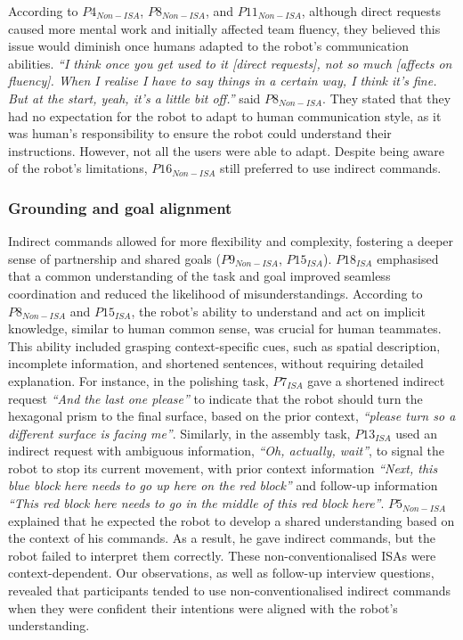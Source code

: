 According to $P4_{Non-ISA}$, $P8_{Non-ISA}$, and $P11_{Non-ISA}$, although direct requests caused more mental work and initially affected team fluency, they believed this issue would diminish once humans adapted to the robot's communication abilities. \textit{``I think once you get used to it [direct requests], not so much [affects on fluency]. When I realise I have to say things in a certain way, I think it's fine. But at the start, yeah, it's a little bit off.''} said $P8_{Non-ISA}$.
They stated that they had no expectation for the robot to adapt to human communication style, as it was human's responsibility to ensure the robot could understand their instructions. However, not all the users were able to adapt. Despite being aware of the robot’s limitations, $P16_{Non-ISA}$ still preferred to use indirect commands.

\subsubsection{Grounding and goal alignment}
Indirect commands allowed for more flexibility and complexity, fostering a deeper sense of partnership and shared goals ($P9_{Non-ISA}$, $P15_{ISA}$). $P18_{ISA}$ emphasised that a common understanding of the task and goal improved seamless coordination and reduced the likelihood of misunderstandings. According to $P8_{Non-ISA}$ and $P15_{ISA}$, the robot's ability to understand and act on implicit knowledge, similar to human common sense, was crucial for human teammates. This ability included grasping context-specific cues, such as spatial description, incomplete information, and shortened sentences, without requiring detailed explanation. For instance, in the polishing task, $P7_{ISA}$ gave a shortened indirect request \textit{``And the last one please''} to indicate that the robot should turn the hexagonal prism to the final surface, based on the prior context, \textit{``please turn so a different surface is facing me''}. Similarly, in the assembly task, $P13_{ISA}$ used an indirect request with ambiguous information, \textit{``Oh, actually, wait''}, to signal the robot to stop its current movement, with prior context information \textit{``Next, this blue block here needs to go up here on the red block''} and follow-up information \textit{``This red block here needs to go in the middle of this red block here''}. $P5_{Non-ISA}$ explained that he expected the robot to develop a shared understanding based on the context of his commands. As a result, he gave indirect commands, but the robot failed to interpret them correctly. These non-conventionalised ISAs were context-dependent.
Our observations, as well as follow-up interview questions, revealed that participants tended to use non-conventionalised indirect commands when they were confident their intentions were aligned with the robot’s understanding.

